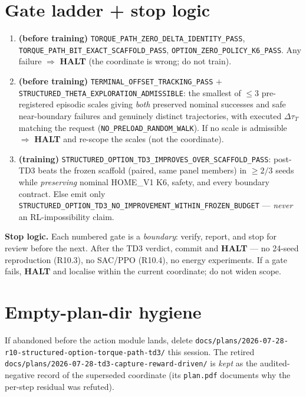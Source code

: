 \documentclass[11pt]{article}
\newcommand{\code}[1]{\texttt{\small #1}}
\newcommand{\halt}{\textcolor{red!70!black}{\textbf{HALT}}}
\begin{document}
\section{Gate ladder + stop logic}
\begin{enumerate}[nosep,leftmargin=1.6em]
  \item \textbf{(before training)} \code{TORQUE\_PATH\_ZERO\_DELTA\_IDENTITY\_PASS}, \code{TORQUE\_PATH\_BIT\_EXACT\_SCAFFOLD\_PASS},
  \code{OPTION\_ZERO\_POLICY\_K6\_PASS}. Any failure $\Rightarrow$ \halt{} (the coordinate is wrong; do not train).
  \item \textbf{(before training)} \code{TERMINAL\_OFFSET\_TRACKING\_PASS} $+$ \code{STRUCTURED\_THETA\_EXPLORATION\_ADMISSIBLE}:
  the smallest of $\le3$ pre-registered episodic scales giving \emph{both} preserved nominal successes and safe near-boundary
  failures and genuinely distinct trajectories, with executed $\Delta\tau_T$ matching the request
  (\code{NO\_PRELOAD\_RANDOM\_WALK}). If no scale is admissible $\Rightarrow$ \halt{} and re-scope the scales (not the
  coordinate).
  \item \textbf{(training)} \code{STRUCTURED\_OPTION\_TD3\_IMPROVES\_OVER\_SCAFFOLD\_PASS}: post-TD3 beats the frozen scaffold
  (paired, same panel members) in $\ge2/3$ seeds while \emph{preserving} nominal HOME\_V1 K6, safety, and every boundary
  contract. Else emit only \code{STRUCTURED\_OPTION\_TD3\_NO\_IMPROVEMENT\_WITHIN\_FROZEN\_BUDGET} --- \emph{never} an
  RL-impossibility claim.
\end{enumerate}
\textbf{Stop logic.} Each numbered gate is a \emph{boundary}: verify, report, and stop for review before the next. After
the TD3 verdict, commit and \halt{} --- no 24-seed reproduction (R10.3), no SAC/PPO (R10.4), no energy experiments. If a gate
fails, \halt{} and localise within the current coordinate; do not widen scope.

\section{Empty-plan-dir hygiene}
If abandoned before the action module lands, delete \code{docs/plans/2026-07-28-r10-structured-option-torque-path-td3/} this
session. The retired \code{docs/plans/2026-07-28-td3-capture-reward-driven/} is \emph{kept} as the audited-negative record
of the superseded coordinate (its \code{plan.pdf} documents why the per-step residual was refuted).
\end{document}
